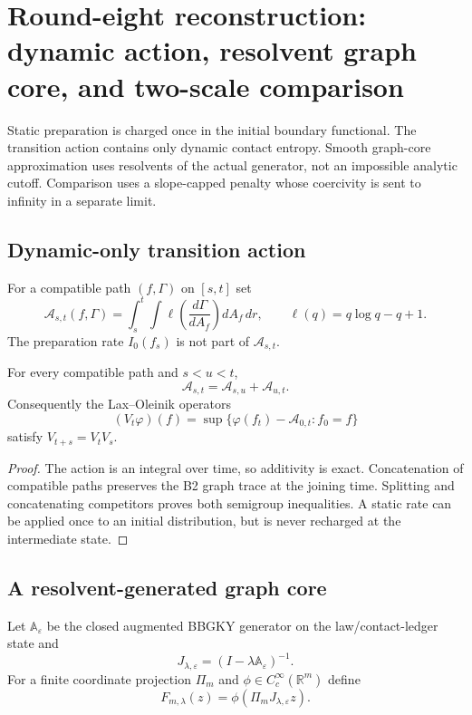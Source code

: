 \section{Round-eight reconstruction: dynamic action, resolvent graph core, and two-scale comparison}
\label{sec:r8-b4}

Static preparation is charged once in the initial boundary functional.  The
transition action contains only dynamic contact entropy.  Smooth graph-core
approximation uses resolvents of the actual generator, not an impossible
analytic cutoff.  Comparison uses a slope-capped penalty whose coercivity is
sent to infinity in a separate limit.

\subsection{Dynamic-only transition action}

For a compatible path $(f,\Gamma)$ on $[s,t]$ set
\[
 \mathcal A_{s,t}(f,\Gamma)
 =\int_s^t\int\ell\!\left(\frac{d\Gamma}{dA_f}\right)dA_f\,dr,
 \qquad \ell(q)=q\log q-q+1.
\]
The preparation rate $I_0(f_s)$ is not part of $\mathcal A_{s,t}$.

\begin{lemma}
\label{lem:r8-b4-cost}
For every compatible path and $s<u<t$,
\[
 \mathcal A_{s,t}=\mathcal A_{s,u}+\mathcal A_{u,t}.
\]
Consequently the Lax--Oleinik operators
\[
 (V_t\varphi)(f)=\sup\{\varphi(f_t)-\mathcal A_{0,t}:f_0=f\}
\]
satisfy $V_{t+s}=V_tV_s$.
\end{lemma}

\begin{proof}
The action is an integral over time, so additivity is exact.  Concatenation of
compatible paths preserves the B2 graph trace at the joining time.  Splitting
and concatenating competitors proves both semigroup inequalities.  A static
rate can be applied once to an initial distribution, but is never recharged at
the intermediate state.
\end{proof}

\subsection{A resolvent-generated graph core}

Let $\mathbb A_\varepsilon$ be the closed augmented BBGKY generator on the
law/contact-ledger state and
\[
 J_{\lambda,\varepsilon}=(I-\lambda\mathbb A_\varepsilon)^{-1}.
\]
For a finite coordinate projection $\Pi_m$ and
$\phi\in C_c^\infty(\mathbb R^m)$ define
\[
 F_{m,\lambda}(z)=\phi(\Pi_mJ_{\lambda,\varepsilon}z).
\]

